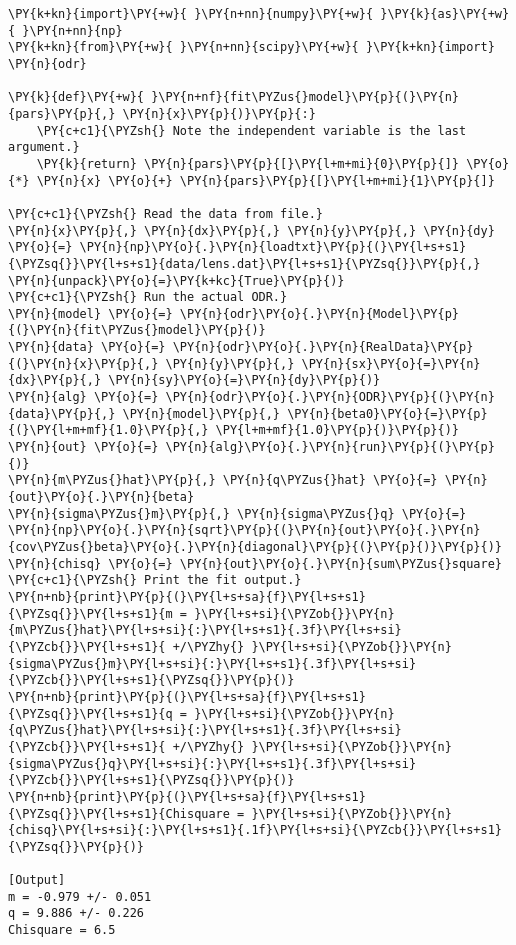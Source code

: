 \begin{Verbatim}[label=\makebox{\href{https://github.com/unipi-physics-labs/lab1-notes/tree/main/snippy/odr.py}{https://github.com/.../odr.py}},commandchars=\\\{\}]
\PY{k+kn}{import}\PY{+w}{ }\PY{n+nn}{numpy}\PY{+w}{ }\PY{k}{as}\PY{+w}{ }\PY{n+nn}{np}
\PY{k+kn}{from}\PY{+w}{ }\PY{n+nn}{scipy}\PY{+w}{ }\PY{k+kn}{import} \PY{n}{odr}

\PY{k}{def}\PY{+w}{ }\PY{n+nf}{fit\PYZus{}model}\PY{p}{(}\PY{n}{pars}\PY{p}{,} \PY{n}{x}\PY{p}{)}\PY{p}{:}
    \PY{c+c1}{\PYZsh{} Note the independent variable is the last argument.}
    \PY{k}{return} \PY{n}{pars}\PY{p}{[}\PY{l+m+mi}{0}\PY{p}{]} \PY{o}{*} \PY{n}{x} \PY{o}{+} \PY{n}{pars}\PY{p}{[}\PY{l+m+mi}{1}\PY{p}{]}

\PY{c+c1}{\PYZsh{} Read the data from file.}
\PY{n}{x}\PY{p}{,} \PY{n}{dx}\PY{p}{,} \PY{n}{y}\PY{p}{,} \PY{n}{dy} \PY{o}{=} \PY{n}{np}\PY{o}{.}\PY{n}{loadtxt}\PY{p}{(}\PY{l+s+s1}{\PYZsq{}}\PY{l+s+s1}{data/lens.dat}\PY{l+s+s1}{\PYZsq{}}\PY{p}{,} \PY{n}{unpack}\PY{o}{=}\PY{k+kc}{True}\PY{p}{)}
\PY{c+c1}{\PYZsh{} Run the actual ODR.}
\PY{n}{model} \PY{o}{=} \PY{n}{odr}\PY{o}{.}\PY{n}{Model}\PY{p}{(}\PY{n}{fit\PYZus{}model}\PY{p}{)}
\PY{n}{data} \PY{o}{=} \PY{n}{odr}\PY{o}{.}\PY{n}{RealData}\PY{p}{(}\PY{n}{x}\PY{p}{,} \PY{n}{y}\PY{p}{,} \PY{n}{sx}\PY{o}{=}\PY{n}{dx}\PY{p}{,} \PY{n}{sy}\PY{o}{=}\PY{n}{dy}\PY{p}{)}
\PY{n}{alg} \PY{o}{=} \PY{n}{odr}\PY{o}{.}\PY{n}{ODR}\PY{p}{(}\PY{n}{data}\PY{p}{,} \PY{n}{model}\PY{p}{,} \PY{n}{beta0}\PY{o}{=}\PY{p}{(}\PY{l+m+mf}{1.0}\PY{p}{,} \PY{l+m+mf}{1.0}\PY{p}{)}\PY{p}{)}
\PY{n}{out} \PY{o}{=} \PY{n}{alg}\PY{o}{.}\PY{n}{run}\PY{p}{(}\PY{p}{)}
\PY{n}{m\PYZus{}hat}\PY{p}{,} \PY{n}{q\PYZus{}hat} \PY{o}{=} \PY{n}{out}\PY{o}{.}\PY{n}{beta}
\PY{n}{sigma\PYZus{}m}\PY{p}{,} \PY{n}{sigma\PYZus{}q} \PY{o}{=} \PY{n}{np}\PY{o}{.}\PY{n}{sqrt}\PY{p}{(}\PY{n}{out}\PY{o}{.}\PY{n}{cov\PYZus{}beta}\PY{o}{.}\PY{n}{diagonal}\PY{p}{(}\PY{p}{)}\PY{p}{)}
\PY{n}{chisq} \PY{o}{=} \PY{n}{out}\PY{o}{.}\PY{n}{sum\PYZus{}square}
\PY{c+c1}{\PYZsh{} Print the fit output.}
\PY{n+nb}{print}\PY{p}{(}\PY{l+s+sa}{f}\PY{l+s+s1}{\PYZsq{}}\PY{l+s+s1}{m = }\PY{l+s+si}{\PYZob{}}\PY{n}{m\PYZus{}hat}\PY{l+s+si}{:}\PY{l+s+s1}{.3f}\PY{l+s+si}{\PYZcb{}}\PY{l+s+s1}{ +/\PYZhy{} }\PY{l+s+si}{\PYZob{}}\PY{n}{sigma\PYZus{}m}\PY{l+s+si}{:}\PY{l+s+s1}{.3f}\PY{l+s+si}{\PYZcb{}}\PY{l+s+s1}{\PYZsq{}}\PY{p}{)}
\PY{n+nb}{print}\PY{p}{(}\PY{l+s+sa}{f}\PY{l+s+s1}{\PYZsq{}}\PY{l+s+s1}{q = }\PY{l+s+si}{\PYZob{}}\PY{n}{q\PYZus{}hat}\PY{l+s+si}{:}\PY{l+s+s1}{.3f}\PY{l+s+si}{\PYZcb{}}\PY{l+s+s1}{ +/\PYZhy{} }\PY{l+s+si}{\PYZob{}}\PY{n}{sigma\PYZus{}q}\PY{l+s+si}{:}\PY{l+s+s1}{.3f}\PY{l+s+si}{\PYZcb{}}\PY{l+s+s1}{\PYZsq{}}\PY{p}{)}
\PY{n+nb}{print}\PY{p}{(}\PY{l+s+sa}{f}\PY{l+s+s1}{\PYZsq{}}\PY{l+s+s1}{Chisquare = }\PY{l+s+si}{\PYZob{}}\PY{n}{chisq}\PY{l+s+si}{:}\PY{l+s+s1}{.1f}\PY{l+s+si}{\PYZcb{}}\PY{l+s+s1}{\PYZsq{}}\PY{p}{)}

[Output]
m = -0.979 +/- 0.051
q = 9.886 +/- 0.226
Chisquare = 6.5
\end{Verbatim}

